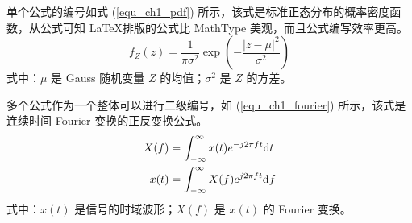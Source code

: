 
单个公式的编号如式 (\ref{equ_ch1_pdf}) 所示，该式是标准正态分布的概率密度函数，从公式可知 \LaTeX 排版的公式比 MathType 美观，而且公式编写效率更高。
%
\begin{equation} \label{equ_ch1_pdf}
	f_Z(z) = \frac{1}{\pi\sigma^2} \exp\left(-\frac{|z-\mu|^2}{\sigma^2}\right)
\end{equation}
%
式中：$\mu$ 是 Gauss 随机变量 $Z$ 的均值；$\sigma^2$ 是 $Z$ 的方差。


多个公式作为一个整体可以进行二级编号，如 (\ref{equ_ch1_fourier}) 所示，该式是连续时间 Fourier 变换的正反变换公式。
%
\begin{subequations} \label{equ_ch1_fourier}
	\begin{align}
		X(f) &= \int_{-\infty}^{\infty}x(t)e^{-j2\pi f t}\mathrm{d} t \\
		x(t) &= \int_{-\infty}^{\infty}X(f)e^{j2\pi f t}\mathrm{d} f
	\end{align}
\end{subequations}
%
式中：$x(t)$ 是信号的时域波形；$X(f)$ 是 $x(t)$ 的 Fourier 变换。
